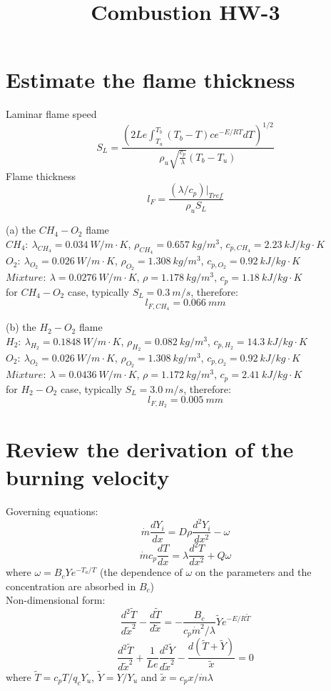 \documentclass{article}
\title{Combustion HW-3}
\author{}
\date{}
\begin{document}
\maketitle

\section{Estimate the flame thickness}
Laminar flame speed 
$$
S_L=\frac{(2Le\int_{T_u}^{T_b} (T_b-T)ce^{-E/RT}dT)^{1/2}}{{\rho}_u\sqrt{\frac{c_p}{\lambda}}(T_b-T_u)}
$$
Flame thickness
$$
l_F=\frac{(\lambda/c_p)|_{Tref}}{\rho_uS_L}
$$

(a) the $CH_4-O_2$ flame\\
$CH_4:\ \lambda_{CH_4}=0.034\ W/m\cdot K$, $\rho_{CH_4}=0.657\ kg/m^3$, $c_{p,CH_4}=2.23\ kJ/kg\cdot K$\\
$O_2:\ \lambda_{O_2}=0.026\ W/m\cdot K$, $\rho_{O_2}=1.308\ kg/m^3$, $c_{p,O_2}=0.92\ kJ/kg\cdot K$\\
$Mixture:\ \lambda=0.0276\ W/m\cdot K$, $\rho=1.178\ kg/m^3$, $c_p=1.18\ kJ/kg\cdot K$\\
for $CH_4-O_2$ case, typically $S_L=0.3\ m/s$, therefore:
$$
l_{F,CH_4}=0.066\ mm
$$

(b) the $H_2-O_2$ flame\\
$H_2:\ \lambda_{H_2}=0.1848\ W/m\cdot K$, $\rho_{H_2}=0.082\ kg/m^3$, $c_{p,H_2}=14.3\ kJ/kg\cdot K$\\
$O_2:\ \lambda_{O_2}=0.026\ W/m\cdot K$, $\rho_{O_2}=1.308\ kg/m^3$, $c_{p,O_2}=0.92\ kJ/kg\cdot K$\\
$Mixture:\ \lambda=0.0436\ W/m\cdot K$, $\rho=1.172\ kg/m^3$, $c_p=2.41\ kJ/kg\cdot K$\\
for $H_2-O_2$ case, typically $S_L=3.0\ m/s$, therefore:
$$
l_{F,H_2}=0.005\ mm
$$


\section{Review the derivation of the burning velocity}
Governing equations:
$$
\dot{m} \frac{dY_i}{dx}=D\rho \frac{d^2Y_i}{dx^2} - \omega
$$
$$
\dot{m} c_p \frac{dT}{dx}=\lambda \frac{d^2T}{dx^2} + Q \omega
$$
where $\omega = B_cYe^{-T_a/T}$ (the dependence of $\omega$ on the  parameters and the concentration are absorbed in $B_c$)\\
Non-dimensional form:
$$
\frac{d^2\tilde{T}}{d\tilde{x}^2} - \frac{d\tilde{T}}{d\tilde{x}} = -\frac{B_c}{c_p\dot{m}^2/\lambda}\tilde{Y}e^{-E/R\tilde{T}}
$$
$$
\frac{d^2\tilde{T}}{d\tilde{x}^2}+\frac{1}{Le}\frac{d^2\tilde{Y}}{d\tilde{x}^2}-\frac{d(\tilde{T}+\tilde{Y})}{\tilde{x}}=0
$$
where $\tilde{T}=c_pT/q_cY_u$, $\tilde{Y}=Y/Y_u$ and $\tilde{x}=c_px/\dot{m}\lambda$
\end{document}

